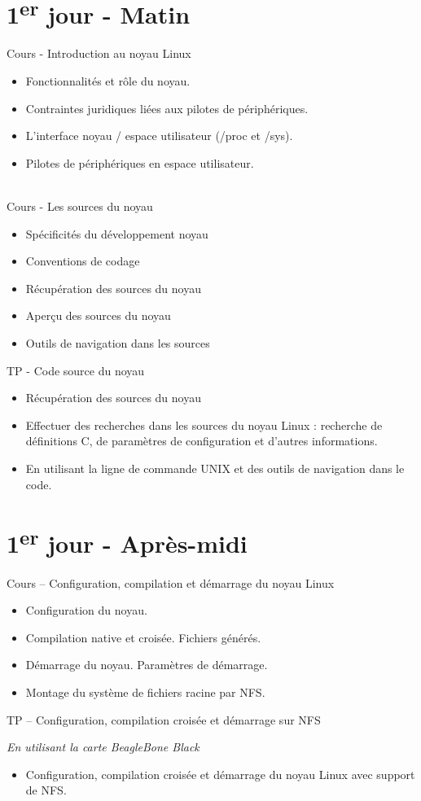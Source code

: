 \documentclass[a4paper,12pt,obeyspaces,spaces,hyphens]{article}
\begin{document}
\section{1\textsuperscript{er} jour - Matin}

\feagendaonecolumn
{Cours - Introduction au noyau Linux}
{
  \begin{itemize}
  \item Fonctionnalités et rôle du noyau.
  \item Contraintes juridiques liées aux pilotes de périphériques.
  \item L'interface noyau / espace utilisateur (/proc et /sys).
  \item Pilotes de périphériques en espace utilisateur.
  \end{itemize}
}
\\
\feagendatwocolumn
{Cours - Les sources du noyau}
{
  \begin{itemize}
  \item Spécificités du développement noyau
  \item Conventions de codage
  \item Récupération des sources du noyau
  \item Aperçu des sources du noyau
  \item Outils de navigation dans les sources
  \end{itemize}
}
{TP - Code source du noyau}
{
  \begin{itemize}
  \item Récupération des sources du noyau
  \item Effectuer des recherches dans les sources du noyau Linux :
    recherche de définitions C, de paramètres de configuration et d'autres
    informations.
  \item En utilisant la ligne de commande UNIX et des outils de
    navigation dans le code.
 \end{itemize}
}

\section{1\textsuperscript{er} jour - Après-midi}
\feagendatwocolumn
{Cours – Configuration, compilation et démarrage du noyau Linux}
{
  \begin{itemize}
  \item Configuration du noyau.
  \item Compilation native et croisée. Fichiers générés.
  \item Démarrage du noyau. Paramètres de démarrage.
  \item Montage du système de fichiers racine par NFS.
  \end{itemize}
}
{TP – Configuration, compilation croisée et démarrage sur NFS}
{
  {\em En utilisant la carte BeagleBone Black}
  \begin{itemize}
  \item Configuration, compilation croisée et démarrage du noyau Linux
    avec support de NFS.
  \end{itemize}
}
\\
\end{document}
